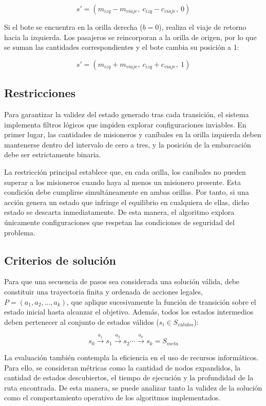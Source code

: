 \documentclass[
  spanish,
  11pt,
]{article}
\begin{document}
\[
s' = (m_{izq}-m_{viaje},\ c_{izq}-c_{viaje},\ 0)
\]

Si el bote se encuentra en la orilla derecha (\(b=0\)), realiza el viaje
de retorno hacia la izquierda. Los pasajeros se reincorporan a la orilla
de origen, por lo que se suman las cantidades correspondientes y el bote
cambia su posición a 1:

\[
s' = (m_{izq}+m_{viaje},\ c_{izq}+c_{viaje},\ 1)
\]

\subsection{Restricciones}\label{restricciones}

Para garantizar la validez del estado generado tras cada transición, el
sistema implementa filtros lógicos que impiden explorar configuraciones
inviables. En primer lugar, las cantidades de misioneros y caníbales en
la orilla izquierda deben mantenerse dentro del intervalo de cero a
tres, y la posición de la embarcación debe ser estrictamente binaria.

La restricción principal establece que, en cada orilla, los caníbales no
pueden superar a los misioneros cuando haya al menos un misionero
presente. Esta condición debe cumplirse simultáneamente en ambas
orillas. Por tanto, si una acción genera un estado que infringe el
equilibrio en cualquiera de ellas, dicho estado se descarta
inmediatamente. De esta manera, el algoritmo explora únicamente
configuraciones que respetan las condiciones de seguridad del problema.

\subsection{Criterios de solución}\label{criterios-de-soluciuxf3n}

Para que una secuencia de pasos sea considerada una solución válida,
debe constituir una trayectoria finita y ordenada de acciones legales,
\(P=(a_1,a_2,\ldots,a_k)\), que aplique sucesivamente la función de
transición sobre el estado inicial hasta alcanzar el objetivo. Además,
todos los estados intermedios deben pertenecer al conjunto de estados
válidos (\(s_i\in S_{válidos}\)):

\[
s_0\xrightarrow{a_1}s_1\xrightarrow{a_2}s_2\cdots\xrightarrow{a_k}s_k=S_{meta}
\]

La evaluación también contempla la eficiencia en el uso de recursos
informáticos. Para ello, se consideran métricas como la cantidad de
nodos expandidos, la cantidad de estados descubiertos, el tiempo de
ejecución y la profundidad de la ruta encontrada. De esta manera, se
puede analizar tanto la validez de la solución como el comportamiento
operativo de los algoritmos implementados.
\end{document}
